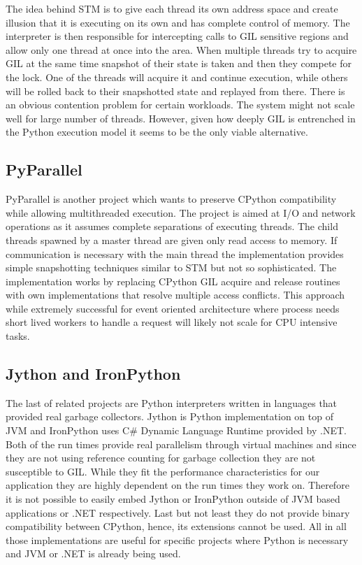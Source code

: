 \documentclass[12pt, a4paper]{report}
\begin{document}
The idea behind STM is to give each thread its own address space and
create illusion that it is executing on its own and has complete
control of memory. The interpreter is then responsible for intercepting
calls to GIL sensitive regions and allow only one thread at once into
the area. When multiple threads try to acquire GIL at the same time
snapshot of their state is taken and then they compete for the lock.
One of the threads will acquire it and continue execution, while
others will be rolled back to their snapshotted state and replayed
from there. There is an obvious contention problem for certain
workloads. The system might not scale well for large number of
threads. However, given how deeply GIL is entrenched in the Python
execution model it seems to be the only viable alternative.

\subsection{PyParallel}\label{subsec:pyparallel}
PyParallel is another project which wants to preserve CPython compatibility
while allowing multithreaded execution. The project is aimed at I/O and
network operations as it assumes complete separations of executing
threads. The child threads spawned by a master thread are given only
read access to memory. If communication is necessary with the main
thread the implementation provides simple snapshotting techniques
similar to STM but not so sophisticated. The implementation works
by replacing CPython GIL acquire and release routines
with own implementations that resolve multiple access conflicts. This
approach while extremely successful for event oriented architecture
where process needs short lived workers to handle a request will
likely not scale for CPU intensive tasks.

\subsection{Jython and IronPython}\label{subsec:other-python-impl}
The last of related projects are Python interpreters written in languages
that provided real garbage collectors. Jython is Python implementation on
top of JVM and IronPython uses C\# Dynamic Language Runtime provided by
.NET. Both of the run times provide real parallelism through virtual machines
and since they are not using reference counting for garbage collection
they are not susceptible to GIL. While they fit the performance characteristics
for our application they are highly dependent on the run times they work on.
Therefore it is not possible to easily embed Jython or IronPython outside
of JVM based applications or .NET respectively. Last but not least they
do not provide binary compatibility between CPython, hence, its extensions
cannot be used. All in all those implementations are useful for specific
projects where Python is necessary and JVM or .NET is already being used.
\end{document}
